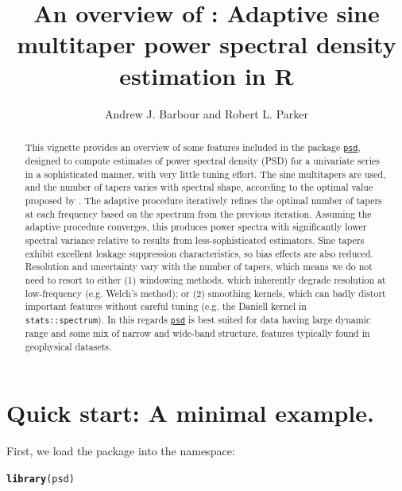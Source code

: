 \documentclass{article}\usepackage{graphicx, color}
\author{Andrew J. Barbour and Robert L. Parker}
\title{An overview of \psd{}: Adaptive sine multitaper power spectral density estimation in R}
\makeatletter
\newcommand{\hlfunctioncall}[1]{\textcolor[rgb]{0.501960784313725,0,0.329411764705882}{\textbf{#1}}}%
\newenvironment{kframe}{%
 \def\at@end@of@kframe{}%
 \ifinner\ifhmode%
  \def\at@end@of@kframe{\end{minipage}}%
  \begin{minipage}{\columnwidth}%
 \fi\fi%
 \def\FrameCommand##1{\hskip\@totalleftmargin \hskip-\fboxsep
 \colorbox{shadecolor}{##1}\hskip-\fboxsep
     \hskip-\linewidth \hskip-\@totalleftmargin \hskip\columnwidth}%
 \MakeFramed {\advance\hsize-\width
   \@totalleftmargin\z@ \linewidth\hsize
   \@setminipage}}%
 {\par\unskip\endMakeFramed%
 \at@end@of@kframe}
\newenvironment{knitrout}{}{} %
\newcommand{\Rcmd}[1]{\texttt{#1}}
\newcommand{\psd}[0]{\href{http://abarbour.github.com/psd/}{\color{blue}\Rcmd{psd}}}
\makeatother
\begin{document}
\maketitle
\begin{abstract}
  This vignette provides an overview of some 
  features included in the package \psd{}, designed to
  compute estimates of power spectral
  density (PSD) for a univariate series in a sophisticated manner,
  with very little tuning effort.
  The sine multitapers are used, and
  the number of tapers varies with spectral shape, according
  to the optimal value proposed by \citet{rs1995}.
  The adaptive procedure
  iteratively refines the optimal number of tapers at each frequency
  based on the spectrum from the previous iteration.
  Assuming the adaptive procedure converges, 
  this produces power spectra
  with significantly
  lower spectral variance 
  relative to results from less-sophisticated estimators.
  Sine tapers exhibit excellent
  leakage suppression characteristics, so bias effects
  are also reduced.
  Resolution and uncertainty vary with the number of tapers,
  which means we do
  not need to resort to either (1) windowing methods,
  which inherently degrade resolution at low-frequency
  (e.g. Welch's method); or (2) smoothing kernels,
  which can badly distort important features without careful tuning
  (e.g. the Daniell kernel in \Rcmd{stats::spectrum}).
  In this regards
  \psd{} is best suited for data having 
   large dynamic range and some mix of narrow and wide-band structure,
   features typically found in geophysical datasets.
\end{abstract}

\tableofcontents
\pagebreak

\section{Quick start: A minimal example.}
First, we load the package into the namespace:


\begin{knitrout}
\color{fgcolor}\begin{kframe}
\begin{alltt}
\hlfunctioncall{library}(psd)
\end{alltt}


{\ttfamily\noindent\itshape\color{messagecolor}{\#\# Loading required package: fftw}}

{\ttfamily\noindent\itshape\color{messagecolor}{\#\# Loaded psd (0.3.0) -- Adaptive multitaper spectrum estimation.}}\end{kframe}
\end{knitrout}
\end{document}
